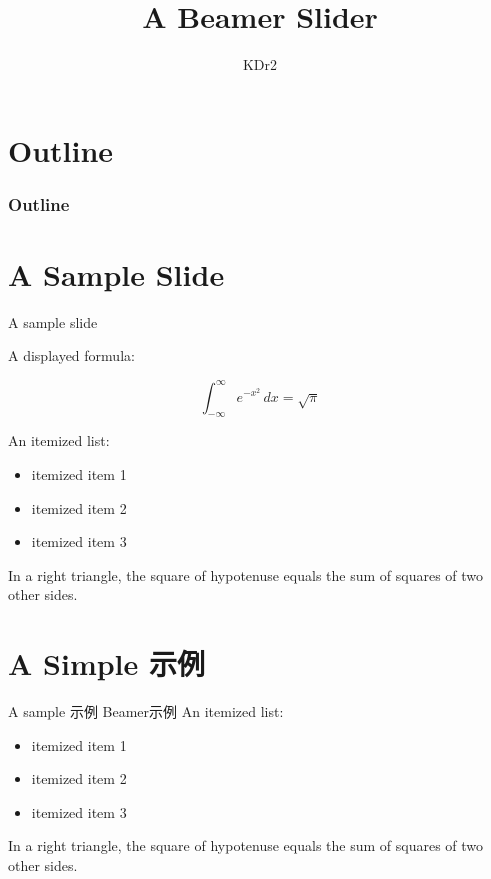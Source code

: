 \documentclass[unicode]{beamer}
\title{A Beamer Slider}
\author{KDr2}
\begin{document}
\begin{CJK}{UTF8}{gbsn}

  \maketitle{}

  \section{Outline}
  \begin{frame}
    \frametitle{Outline}
    \setcounter{tocdepth}{4}
    \tableofcontents
  \end{frame}

  \section{A Sample Slide}
  \begin{frame}{A sample slide}

    A displayed formula:

    \[
    \int_{-\infty}^\infty e^{-x^2} \, dx = \sqrt{\pi}
    \]

    An itemized list:
    \begin{itemize}
    \item itemized item 1
    \item itemized item 2
    \item itemized item 3
    \end{itemize}

    \begin{theorem}
      In a right triangle, the square of hypotenuse equals
      the sum of squares of two other sides.
    \end{theorem}
  \end{frame}

  \section{A Simple 示例}
  \begin{frame}{A sample 示例}
    Beamer示例
    An itemized list:
    \begin{itemize}
    \item itemized item 1
    \item itemized item 2
    \item itemized item 3
    \end{itemize}
    \pause{}
    \begin{theorem}
      In a right triangle, the square of hypotenuse equals
      the sum of squares of two other sides.
    \end{theorem}
  \end{frame}
\end{CJK}
\end{document}
